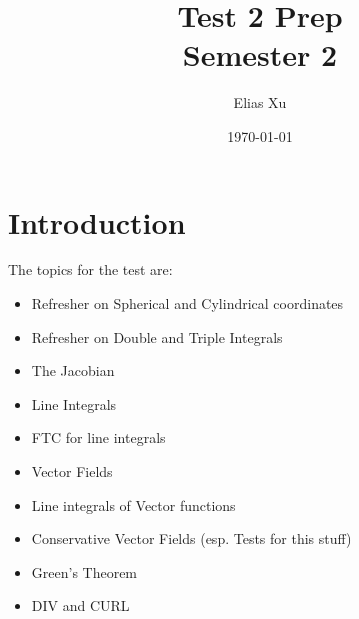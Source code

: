 \documentclass{article}
\begin{document}
\title{Test 2 Prep \\
    \large{Semester 2}}
\author{Elias Xu}
\date{\today}
\maketitle

\tableofcontents

\setlength{\parindent}{0pt}

\section{Introduction}

The topics for the test are:

\begin{itemize}
    \item Refresher on Spherical and Cylindrical coordinates
    \item Refresher on Double and Triple Integrals
    \item The Jacobian
    \item Line Integrals
    \item FTC for line integrals
    \item Vector Fields
    \item Line integrals of Vector functions
    \item Conservative Vector Fields (esp. Tests for this stuff)
    \item Green's Theorem
    \item DIV and CURL
\end{itemize}

\section{}
\end{document}
